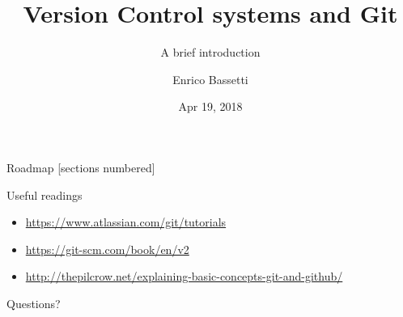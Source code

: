 \documentclass[10pt]{beamer}
\title{Version Control systems and Git}
\subtitle{A brief introduction}
\date{Apr 19, 2018}
\author{Enrico Bassetti}
\institute{Sapienza - University of Rome}
\begin{document}

\maketitle

\begin{frame}{Roadmap}
  [sections numbered]
  \tableofcontents[hideallsubsections]
\end{frame}





\begin{frame}{Useful readings}

\begin{itemize}
  \item \url{https://www.atlassian.com/git/tutorials}
  \item \url{https://git-scm.com/book/en/v2}
  \item \url{http://thepilcrow.net/explaining-basic-concepts-git-and-github/}
\end{itemize}

\end{frame}

\begin{frame}[standout]
  Questions?
\end{frame}

\begin{frame}{}

  \begin{center}\ccbysa\end{center}

\end{frame}
\end{document}
